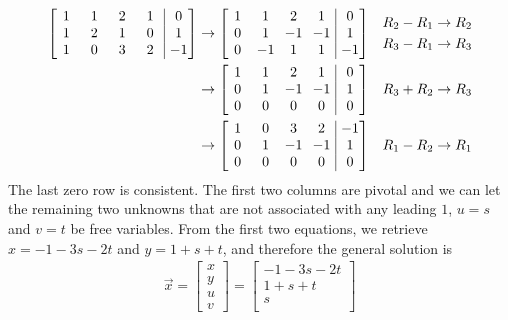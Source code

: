 \begin{solution}
\begin{align*}
\left[\begin{array}{@{\,}wc{10pt}wc{10pt}wc{10pt}wc{10pt}|wc{10pt}@{\,}}
1 & 1 & 2 & 1 & 0 \\
1 & 2 & 1 & 0 & 1 \\
1 & 0 & 3 & 2 & -1
\end{array}\right] 
& \to 
\left[\begin{array}{@{\,}wc{10pt}wc{10pt}wc{10pt}wc{10pt}|wc{10pt}@{\,}}
1 & 1 & 2 & 1 & 0 \\
0 & 1 & -1 & -1 & 1 \\
0 & -1 & 1 & 1 & -1
\end{array}\right] 
& \begin{aligned}
R_2 - R_1 &\to R_2 \\
R_3 - R_1 &\to R_3
\end{aligned} \\
& \to 
\left[\begin{array}{@{\,}wc{10pt}wc{10pt}wc{10pt}wc{10pt}|wc{10pt}@{\,}}
1 & 1 & 2 & 1 & 0 \\
0 & 1 & -1 & -1 & 1 \\
0 & 0 & 0 & 0 & 0
\end{array}\right] 
& R_3 + R_2 \to R_3 \\
& \to 
\left[\begin{array}{@{\,}wc{10pt}wc{10pt}wc{10pt}wc{10pt}|wc{10pt}@{\,}}
1 & 0 & 3 & 2 & -1 \\
0 & 1 & -1 & -1 & 1 \\
0 & 0 & 0 & 0 & 0
\end{array}\right] 
& R_1 - R_2 \to R_1
\end{align*} 
The last zero row is consistent. The first two columns are pivotal and we can let the remaining two unknowns that are not associated with any leading $1$, $u=s$ and $v=t$ be free variables. From the first two equations, we retrieve $x = -1 - 3s - 2t$ and $y = 1 + s + t$, and therefore the general solution is
\begin{align*}
\vec{x} = 
\begin{bmatrix}
x \\
y \\
u \\
v
\end{bmatrix} 
=
\begin{bmatrix}
-1 - 3s - 2t \\
1 + s + t \\
s \\

\end{bmatrix}
\end{align*}
\end{solution}
